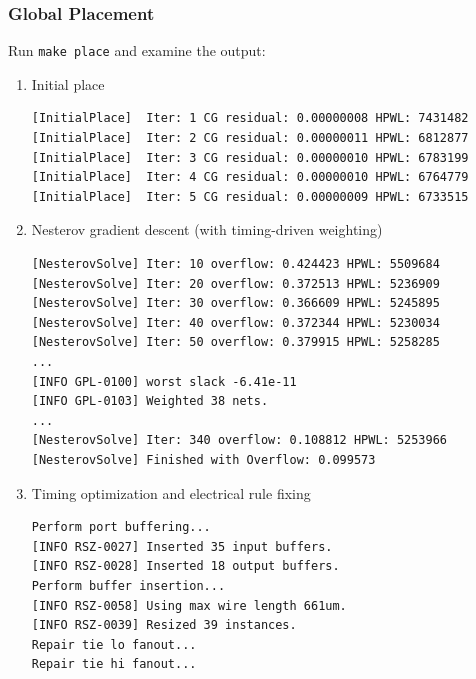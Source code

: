 \documentclass[a4paper,12pt,twoside]{article}
\begin{document}
\subsubsection{Global Placement}
Run \texttt{make place} and examine the output:
\begin{enumerate}
    \item Initial place
    \begin{verbatim}
[InitialPlace]  Iter: 1 CG residual: 0.00000008 HPWL: 7431482
[InitialPlace]  Iter: 2 CG residual: 0.00000011 HPWL: 6812877
[InitialPlace]  Iter: 3 CG residual: 0.00000010 HPWL: 6783199
[InitialPlace]  Iter: 4 CG residual: 0.00000010 HPWL: 6764779
[InitialPlace]  Iter: 5 CG residual: 0.00000009 HPWL: 6733515
    \end{verbatim}
    \item Nesterov gradient descent (with timing-driven weighting)
    \begin{verbatim}
[NesterovSolve] Iter: 10 overflow: 0.424423 HPWL: 5509684
[NesterovSolve] Iter: 20 overflow: 0.372513 HPWL: 5236909
[NesterovSolve] Iter: 30 overflow: 0.366609 HPWL: 5245895
[NesterovSolve] Iter: 40 overflow: 0.372344 HPWL: 5230034
[NesterovSolve] Iter: 50 overflow: 0.379915 HPWL: 5258285
...
[INFO GPL-0100] worst slack -6.41e-11
[INFO GPL-0103] Weighted 38 nets.
...
[NesterovSolve] Iter: 340 overflow: 0.108812 HPWL: 5253966
[NesterovSolve] Finished with Overflow: 0.099573
    \end{verbatim}
    \item Timing optimization and electrical rule fixing
    \begin{verbatim}
Perform port buffering...
[INFO RSZ-0027] Inserted 35 input buffers.
[INFO RSZ-0028] Inserted 18 output buffers.
Perform buffer insertion...
[INFO RSZ-0058] Using max wire length 661um.
[INFO RSZ-0039] Resized 39 instances.
Repair tie lo fanout...
Repair tie hi fanout...
    \end{verbatim}
\end{enumerate}
\end{document}
